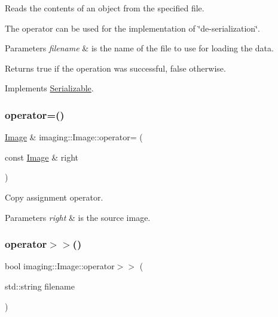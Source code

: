 Reads the contents of an object from the specified file.

The operator can be used for the implementation of \char`\"{}de-\/serialization\char`\"{}.


\begin{DoxyParams}{Parameters}
{\em filename} & is the name of the file to use for loading the data.\\
\hline
\end{DoxyParams}
\begin{DoxyReturn}{Returns}
true if the operation was successful, false otherwise. 
\end{DoxyReturn}


Implements \hyperlink{class_serializable_a5a8ec3fd8411693715ac76b1a10386ba}{Serializable}.

\mbox{\label{classimaging_1_1_image_a58df2b10b12f72089effb8fa945d174c}} 
\subsubsection{\texorpdfstring{operator=()}{operator=()}}
{\footnotesize\ttfamily \hyperlink{classimaging_1_1_image}{Image} \& imaging\+::\+Image\+::operator= (\begin{DoxyParamCaption}\item[{const \hyperlink{classimaging_1_1_image}{Image} \&}]{right }\end{DoxyParamCaption})}

Copy assignment operator.


\begin{DoxyParams}{Parameters}
{\em right} & is the source image. \\
\hline
\end{DoxyParams}
\mbox{\label{classimaging_1_1_image_aeaf5fcad3d1b49a0f127e0d88dfce5e3}} 
\subsubsection{\texorpdfstring{operator$>$$>$()}{operator>>()}}
{\footnotesize\ttfamily bool imaging\+::\+Image\+::operator$>$$>$ (\begin{DoxyParamCaption}\item[{std\+::string}]{filename }\end{DoxyParamCaption})\hspace{0.3cm}{\ttfamily [virtual]}}

